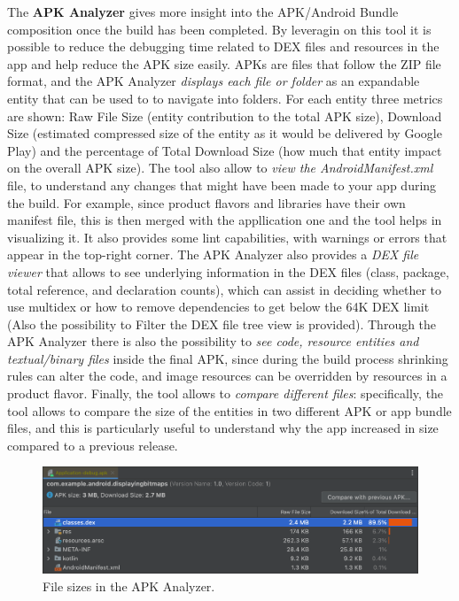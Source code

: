 \noindent The \textbf{APK Analyzer} gives more insight into the APK/Android Bundle composition once the build has been completed. By leveragin on this tool it is possible to reduce the debugging time related to DEX files and resources in the app and help reduce the APK size easily. APKs are files that follow the ZIP file format, and the APK Analyzer \textit{displays each file or folder} as an expandable entity that can be used to to navigate into folders. For each entity three metrics are shown: Raw File Size (entity contribution to the total APK size), Download Size (estimated compressed size of the entity as it would be delivered by Google Play) and the percentage of Total Download Size (how much that entity impact on the overall APK size). The tool also allow to \textit{view the AndroidManifest.xml} file, to understand any changes that might have been made to your app during the build. For example, since product flavors and libraries have their own manifest file, this is then merged with the appllication one and the tool helps in visualizing it. It also provides some lint capabilities, with warnings or errors that appear in the top-right corner. The APK Analyzer also provides a \textit{DEX file viewer} that allows to see underlying information in the DEX files (class, package, total reference, and declaration counts), which can assist in deciding whether to use multidex or how to remove dependencies to get below the 64K DEX limit (Also the possibility to Filter the DEX file tree view is provided). Through the APK Analyzer there is also the possibility to \textit{see code, resource entities and textual/binary files} inside the final APK, since during the build process shrinking rules can alter the code, and image resources can be overridden by resources in a product flavor. Finally, the tool allows to \textit{compare different files}: specifically, the tool allows to compare the size of the entities in two different APK or app bundle files, and this is particularly useful to understand why the app increased in size compared to a previous release\cite{AndroidStudioAPKAnalyzerFeature}.

\begin{figure}
    \includegraphics[width=1.0\linewidth]{./images/apk_file_sizes.png}
    \caption[File sizes in the APK Analyzer.]{File sizes in the APK Analyzer\protect\cite{AndroidStudioAPKAnalyzerFeature}.}
\end{figure}

